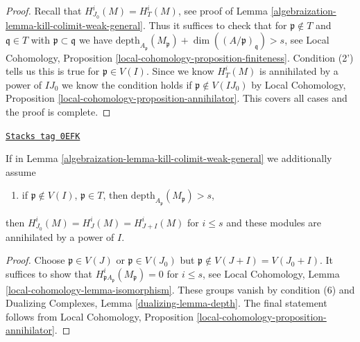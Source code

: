 \begin{proof}

Recall that $H^i_{J_0}(M) = H^i_T(M)$, see proof of
Lemma \ref{algebraization-lemma-kill-colimit-weak-general}. Thus it suffices to
check that for $\mathfrak p \not \in T$ and $\mathfrak q \in T$
with $\mathfrak p \subset \mathfrak q$ we have
$\text{depth}_{A_\mathfrak p}(M_\mathfrak p) +
\dim((A/\mathfrak p)_\mathfrak q) > s$, see Local Cohomology,
Proposition \ref{local-cohomology-proposition-finiteness}.
Condition (2') tells us this is true for $\mathfrak p \in V(I)$.
Since we know $H^i_T(M)$ is annihilated by a power of $IJ_0$
we know the condition holds if $\mathfrak p \not \in V(IJ_0)$
by Local Cohomology, Proposition \ref{local-cohomology-proposition-annihilator}.
This covers all cases and the proof is complete.
\end{proof}

\begin{lemma}
\label{algebraization-lemma-kill-colimit-support-general}
\href{https://stacks.math.columbia.edu/tag/0EFK}{\texttt{Stacks tag 0EFK}}

If in Lemma \ref{algebraization-lemma-kill-colimit-weak-general} we additionally assume
\begin{enumerate}
\item[(6)] if $\mathfrak p \not \in V(I)$, $\mathfrak p \in T$, then
$\text{depth}_{A_\mathfrak p}(M_\mathfrak p) > s$,
\end{enumerate}
then $H^i_{J_0}(M) = H^i_J(M) = H^i_{J + I}(M)$ for $i \leq s$ and these
modules are annihilated by a power of $I$.
\end{lemma}

\begin{proof}
Choose $\mathfrak p \in V(J)$ or $\mathfrak p \in V(J_0)$ but
$\mathfrak p \not \in V(J + I) = V(J_0 + I)$.
It suffices to show that $H^i_{\mathfrak pA_\mathfrak p}(M_\mathfrak p) = 0$
for $i \leq s$, see
Local Cohomology, Lemma \ref{local-cohomology-lemma-isomorphism}.
These groups vanish by condition (6) and
Dualizing Complexes, Lemma \ref{dualizing-lemma-depth}.
The final statement follows from
Local Cohomology, Proposition \ref{local-cohomology-proposition-annihilator}.
\end{proof}

